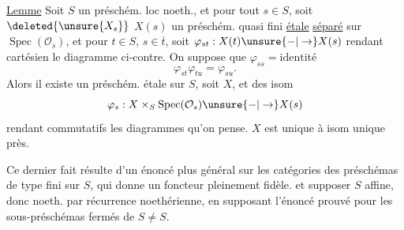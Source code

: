 \uline{Lemme} Soit $S$ un préschém. loc noeth., et pour tout $s\in S$, soit $\deleted{\unsure{X_s}}$ $X(s)$ un préschém. quasi fini \uline{étale} \uline{séparé} sur $\operatorname{Spec}(\mathcal O_s)$, et pour $t\in S$, $s\in\overline t$, soit $\varphi_{st}:X(t)\unsure{-|\to}X(s)$ rendant cartésien le diagramme ci-contre.
On suppose que $\varphi_{ss}=\text{identité}$
\[
\varphi_{st}\varphi_{tu}=\varphi_{su}.
\]
Alors il existe un préschém. étale  sur $S$, soit $X$, et des isom
\[
\varphi_s:X\times_S\operatorname{Spec}(\mathcal O_s)\unsure{-|\to}X(s)
\]
rendant commutatifs les diagrammes qu'on pense. $X$ est unique à isom unique près.

Ce dernier fait résulte d'un énoncé plus général sur les catégories des préschémas de type fini sur $S$, qui donne un foncteur pleinement fidèle.  et supposer $S$ affine, donc noeth.  par récurrence noethérienne, en supposant l'énoncé prouvé pour les sous-préschémas fermés de $S\ne S$.
